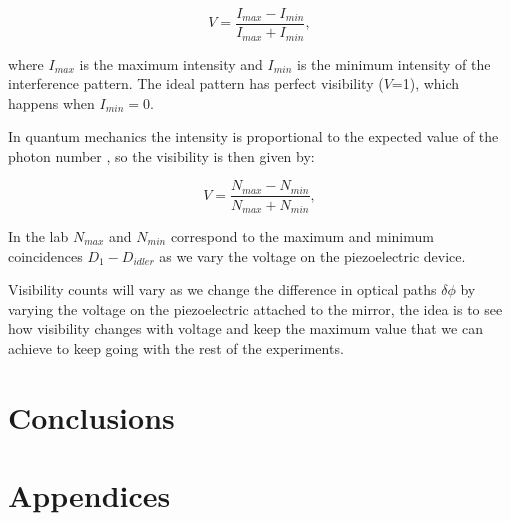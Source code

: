 \documentclass{book}
\begin{document}
\begin{equation}
V=\frac{I_{max}-I_{min}}{I_{max}+I_{min}},
\end{equation}

where $I_{max}$ is the maximum intensity and $I_{min}$ is the minimum intensity of the interference pattern. The ideal pattern has perfect visibility ($V$=1), which happens when $I_{min}=0$.

In quantum mechanics the intensity is proportional to the expected value of the photon number \cite {glauber}, so the visibility is then given by:

\begin{equation}
V=\frac{N_{max}-N_{min}}{N_{max}+N_{min}},
\end{equation}

In the lab $N_{max}$ and $N_{min}$ correspond to the maximum and minimum coincidences $D_{1}-D_{idler}$ as we vary the voltage on the piezoelectric device.

Visibility counts will vary as we change the difference in optical paths $\delta\phi$ by varying the voltage on the piezoelectric attached to the mirror, the idea is to see how visibility changes with voltage and keep the maximum value that we can achieve to keep going with the rest of the experiments.
  
\pagebreak






\pagebreak 
\chapter*{Conclusions}
\pagebreak


\chapter*{Appendices}
\pagebreak





\vspace{1 cm}
\end{document}
